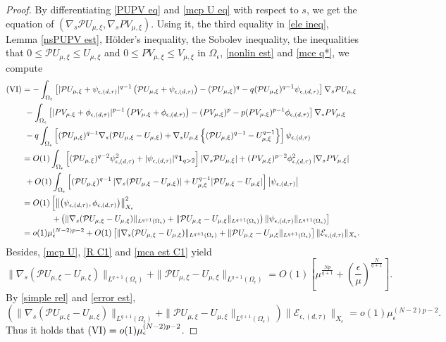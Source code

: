 \documentclass[reqno]{amsart}
\theoremstyle{remark}
\newcommand{\ep}{\epsilon}
\newcommand{\mone}{\mathbf{1}}
\newcommand{\mce}{\mathcal{E}}
\newcommand{\mcp}{\mathcal{P}}
\newcommand{\mx}{{\mu,\xi}}
\renewcommand{\(}{\left(}
\renewcommand{\)}{\right)}
\numberwithin{equation}{section}
\begin{document}
\begin{proof}
By differentiating \eqref{PUPV eq} and \eqref{mcp U eq} with respect to $s$, we get the equation of $(\nabla_s\mcp U_\mx,\nabla_sPV_\mx)$.
Using it, the third equality in \eqref{ele ineq}, Lemma \ref{nsPUPV est}, H\"older's inequality, the Sobolev inequality, the inequalities that $0 \le \mcp U_\mx \le U_\mx$
and $0 \le PV_\mx \le V_\mx$ in $\Omega_\ep$, \eqref{nonlin est} and \eqref{mce q*}, we compute
\begin{align*}
\textup{(VI)} &= -\int_{\Omega_\ep} \left[|\mcp U_\mx+\psi_{\ep,(d,\tau)}|^{q-1}\(\mcp U_\mx+\psi_{\ep,(d,\tau)}\) - (\mcp U_\mx)^q - q(\mcp U_\mx)^{q-1}\psi_{\ep,(d,\tau)}\right] \nabla_s\mcp U_\mx \\
&\ -\int_{\Omega_\ep} \left[|PV_\mx+\phi_{\ep,(d,\tau)}|^{p-1}\(PV_\mx+\phi_{\ep,(d,\tau)}\) - (PV_\mx)^p - p(PV_\mx)^{p-1}\phi_{\ep,(d,\tau)}\right] \nabla_sPV_\mx \\
&\ -q\int_{\Omega_\ep} \left[(\mcp U_\mx)^{q-1} \nabla_s(\mcp U_\mx-U_\mx)+\nabla_s U_\mx \left\{(\mcp U_\mx)^{q-1}-U_\mx^{q-1}\right\}\right] \psi_{\ep,(d,\tau)} \\
&= O(1) \int_{\Omega_\ep} \left[(\mcp U_\mx)^{q-2} \psi_{\ep,(d,\tau)}^2 + |\psi_{\ep,(d,\tau)}|^q \mone_{q > 2}\right] \left|\nabla_s\mcp U_\mx\right| + (PV_\mx)^{p-2} \phi_{\ep,(d,\tau)}^2 \left|\nabla_sPV_\mx\right| \\
&\ + O(1) \int_{\Omega_\ep} \left[(\mcp U_\mx)^{q-1} \left|\nabla_s(\mcp U_\mx-U_\mx)\right|+U_\mx^{q-1}|\mcp U_\mx-U_\mx|\right] \left|\psi_{\ep,(d,\tau)}\right| \\
&= O(1) \left[\left\|\(\psi_{\ep,(d,\tau)},\phi_{\ep,(d,\tau)}\)\right\|_{X_\ep}^2 \right. \\
&\hspace{35pt} \left. + \(\|\nabla_s(\mcp U_\mx-U_\mx)\|_{L^{q+1}(\Omega_\ep)}+\|\mcp U_\mx-U_\mx\|_{L^{q+1}(\Omega_\ep)}\) \|\psi_{\ep,(d,\tau)}\|_{L^{q+1}(\Omega_\ep)}\right] \\
&= o(1)\mu_\ep^{(N-2)p-2} + O(1) \left[\|\nabla_s(\mcp U_\mx-U_\mx)\|_{L^{q+1}(\Omega_\ep)} + \|\mcp U_\mx-U_\mx\|_{L^{q+1}(\Omega_\ep)}\right] \|\mce_{\ep,(d,\tau)}\|_{X_\ep}.
\end{align*}
Besides, \eqref{mcp U}, \eqref{R C1} and \eqref{mca est C1} yield
\begin{equation}\label{mcp U-U}
\|\nabla_s(\mcp U_\mx-U_\mx)\|_{L^{q+1}(\Omega_\ep)} +\| \mcp U_\mx-U_\mx \|_{L^{q+1}(\Omega_\ep)}= O(1)\left[\mu^{\frac{Np}{q+1}} + \(\frac{\ep}{\mu}\)^{\frac{N}{q+1}}\right].
\end{equation}
By \eqref{simple rel} and \eqref{error est},
\[(\|\nabla_s(\mcp U_\mx-U_\mx)\|_{L^{q+1}(\Omega_\ep)}+\| \mcp U_\mx-U_\mx \|_{L^{q+1}(\Omega_\ep)}) \|\mce_{\ep,(d,\tau)}\|_{X_\ep} = o(1)\mu_\ep^{(N-2)p-2}.\]
Thus it holds that $\textup{(VI)} = o(1)\mu_\ep^{(N-2)p-2}$.


\end{proof}
\end{document}
